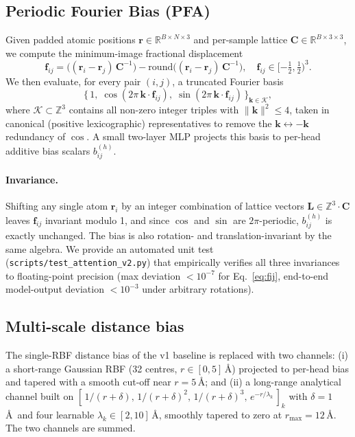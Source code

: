 \documentclass[11pt,a4paper]{article}
\begin{document}
\subsection{Periodic Fourier Bias (PFA)}\label{sec:arch:pfa}
Given padded atomic positions
$\mathbf{r} \in \mathbb{R}^{B \times N \times 3}$ and per-sample
lattice $\mathbf{C} \in \mathbb{R}^{B \times 3 \times 3}$, we compute
the minimum-image fractional displacement
\begin{equation}
\mathbf{f}_{ij} = \bigl((\mathbf{r}_i - \mathbf{r}_j)\,\mathbf{C}^{-1}\bigr)
- \mathrm{round}\bigl((\mathbf{r}_i - \mathbf{r}_j)\,\mathbf{C}^{-1}\bigr),
\quad \mathbf{f}_{ij} \in [-\tfrac{1}{2}, \tfrac{1}{2})^3 .
\label{eq:fij}
\end{equation}
We then evaluate, for every pair $(i, j)$, a truncated Fourier basis
\begin{equation}
\bigl\{\, 1,\;
\cos(2\pi\,\mathbf{k} \cdot \mathbf{f}_{ij}),\;
\sin(2\pi\,\mathbf{k} \cdot \mathbf{f}_{ij}) \,\bigr\}_{\mathbf{k} \in \mathcal{K}},
\label{eq:fourier}
\end{equation}
where $\mathcal{K} \subset \mathbb{Z}^3$ contains all non-zero
integer triples with $\|\mathbf{k}\|^2 \le 4$, taken in canonical
(positive lexicographic) representatives to remove the
$\mathbf{k} \leftrightarrow -\mathbf{k}$ redundancy of $\cos$. A
small two-layer MLP projects this basis to per-head additive bias
scalars $b_{ij}^{(h)}$.

\paragraph{Invariance.} Shifting any single atom $\mathbf{r}_i$ by an
integer combination of lattice vectors
$\mathbf{L} \in \mathbb{Z}^3 \cdot \mathbf{C}$ leaves
$\mathbf{f}_{ij}$ invariant modulo 1, and since $\cos$ and $\sin$ are
$2\pi$-periodic, $b_{ij}^{(h)}$ is exactly unchanged. The bias is
also rotation- and translation-invariant by the same algebra. We
provide an automated unit test
(\texttt{scripts/test\_attention\_v2.py}) that empirically verifies
all three invariances to floating-point precision (max deviation
$< 10^{-7}$ for Eq.~\ref{eq:fij}, end-to-end model-output deviation
$< 10^{-3}$ under arbitrary rotations).

\subsection{Multi-scale distance bias}\label{sec:arch:ms}
The single-RBF distance bias of the v1 baseline is replaced with two
channels: (i) a short-range Gaussian RBF (32 centres,
$r \in [0, 5]$\,\AA) projected to per-head bias and tapered with a
smooth cut-off near $r = 5$\,\AA; and (ii) a long-range analytical
channel built on
$[\,1/(r + \delta),\, 1/(r + \delta)^2,\, 1/(r + \delta)^3,\,
e^{-r/\lambda_k}\,]_k$ with $\delta = 1$\,\AA\ and four learnable
$\lambda_k \in [2, 10]$\,\AA, smoothly tapered to zero at
$r_{\max} = 12$\,\AA. The two channels are summed.
\end{document}
